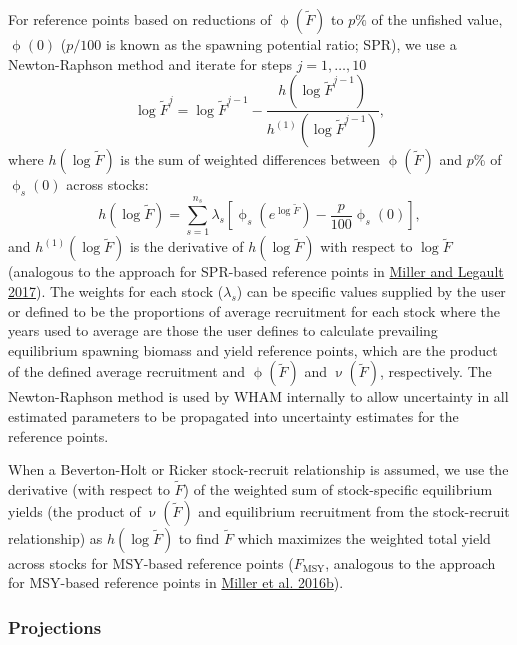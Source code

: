 \documentclass[
]{article}
\begin{document}
For reference points based on reductions of \(\upphi({\widetilde{F}})\) to \(p\%\) of the unfished value, \(\upphi(0)\) (\(p/100\) is known as the spawning potential ratio; SPR), we use a Newton-Raphson method and iterate for steps \(j = 1,\ldots,10\)
\begin{equation}\label{eq:newton}
  \log\widetilde{F}^{j} = \log\widetilde{F}^{j-1} - \frac{h\left(\log\widetilde{F}^{j-1}\right)}{h^{(1)}\left(\log\widetilde{F}^{j-1}\right)},
\end{equation}
where \(h(\log \widetilde{F})\) is the sum of weighted differences between \(\upphi({\widetilde{F}})\) and \(p\)\% of \(\upphi_s\left(0\right)\) across stocks:
\begin{equation}\label{eq:newton-obj}
  h(\log \widetilde{F}) = \sum^{n_s}_{s=1} \lambda_s\left[\upphi_s\left(e^{\log \widetilde{F}}\right) - \frac{p}{100}\upphi_s\left(0\right)\right],
\end{equation}
and \(h^{(1)}(\log \widetilde{F})\) is the derivative of \(h(\log \widetilde{F})\) with respect to \(\log \widetilde{F}\) (analogous to the approach for SPR-based reference points in \protect\hyperlink{ref-millerlegault17}{Miller and Legault 2017}). The weights for each stock (\(\lambda_s\)) can be specific values supplied by the user or defined to be the proportions of average recruitment for each stock where the years used to average are those the user defines to calculate prevailing equilibrium spawning biomass and yield reference points, which are the product of the defined average recruitment and \(\upphi({\widetilde{F}})\) and \(\upnu({\widetilde{F}})\), respectively. The Newton-Raphson method is used by WHAM internally to allow uncertainty in all estimated parameters to be propagated into uncertainty estimates for the reference points.

When a Beverton-Holt or Ricker stock-recruit relationship is assumed, we use the derivative (with respect to \(\widetilde{F}\)) of the weighted sum of stock-specific equilibrium yields (the product of \(\upnu({\widetilde{F}})\) and equilibrium recruitment from the stock-recruit relationship) as \(h(\log \widetilde{F})\) to find \(\widetilde{F}\) which maximizes the weighted total yield across stocks for MSY-based reference points (\(F_{\text{MSY}}\), analogous to the approach for MSY-based reference points in \protect\hyperlink{ref-milleretal16}{Miller et al. 2016b}).

\hypertarget{projections}{%
\subsubsection*{Projections}\label{projections}}
\end{document}
